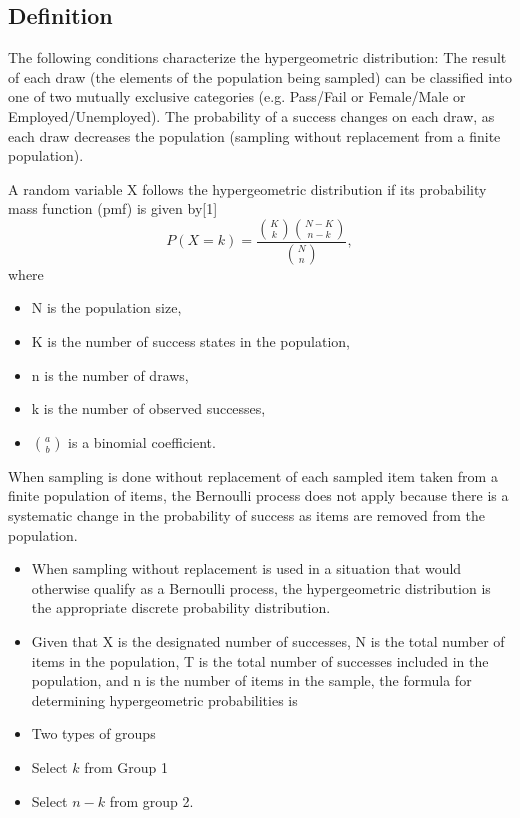 \documentclass[]{report}
\begin{document}
\subsection{Definition}

The following conditions characterize the hypergeometric distribution:
The result of each draw (the elements of the population being sampled) can be classified into one of two mutually exclusive categories (e.g. Pass/Fail or Female/Male or Employed/Unemployed).
The probability of a success changes on each draw, as each draw decreases the population (sampling without replacement from a finite population).

A random variable X follows the hypergeometric distribution if its probability mass function (pmf) is given by[1]
\[ P(X = k) = \frac{\binom{K}{k} \binom{N - K}{n-k}}{\binom{N}{n}},\]
where
\begin{itemize}
\item N is the population size,
\item K is the number of success states in the population,
\item n is the number of draws,
\item k is the number of observed successes,
\item $\textstyle {a \choose b}$ is a binomial coefficient.
\end{itemize}



When sampling is done without replacement of each sampled item taken from a finite population of items, the
Bernoulli process does not apply because there is a systematic change in the probability of success as items are
removed from the population. 


\begin{itemize}
\item When sampling without replacement is used in a situation that would otherwise
qualify as a Bernoulli process, the hypergeometric distribution is the appropriate discrete probability distribution.
\item Given that X is the designated number of successes, N is the total number of items in the population, T is
the total number of successes included in the population, and n is the number of items in the sample, the formula
for determining hypergeometric probabilities is
\end{itemize}


\begin{itemize}
\item Two types of groups

\item Select $k$ from Group 1
\item Select $n-k$ from group 2.
\end{itemize}
\end{document}
